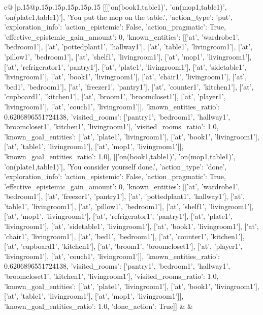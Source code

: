 \documentclass{article}
\begin{document}
{\begin{supertabular}{c@{$\;$}|p{.15\linewidth}@{}p{.15\linewidth}p{.15\linewidth}p{.15\linewidth}p{.15\linewidth}p{.15\linewidth}}
{{{	 [[['on(book1,table1)', 'on(mop1,table1)', 'on(plate1,table1)'], 'You put the mop on the table.', {'action_type': 'put', 'exploration_info': {'action_epistemic': False, 'action_pragmatic': True, 'effective_epistemic_gain_amount': 0, 'known_entities': [['at', 'wardrobe1', 'bedroom1'], ['at', 'pottedplant1', 'hallway1'], ['at', 'table1', 'livingroom1'], ['at', 'pillow1', 'bedroom1'], ['at', 'shelf1', 'livingroom1'], ['at', 'mop1', 'livingroom1'], ['at', 'refrigerator1', 'pantry1'], ['at', 'plate1', 'livingroom1'], ['at', 'sidetable1', 'livingroom1'], ['at', 'book1', 'livingroom1'], ['at', 'chair1', 'livingroom1'], ['at', 'bed1', 'bedroom1'], ['at', 'freezer1', 'pantry1'], ['at', 'counter1', 'kitchen1'], ['at', 'cupboard1', 'kitchen1'], ['at', 'broom1', 'broomcloset1'], ['at', 'player1', 'livingroom1'], ['at', 'couch1', 'livingroom1']], 'known_entities_ratio': 0.6206896551724138, 'visited_rooms': ['pantry1', 'bedroom1', 'hallway1', 'broomcloset1', 'kitchen1', 'livingroom1'], 'visited_rooms_ratio': 1.0, 'known_goal_entities': [['at', 'plate1', 'livingroom1'], ['at', 'book1', 'livingroom1'], ['at', 'table1', 'livingroom1'], ['at', 'mop1', 'livingroom1']], 'known_goal_entities_ratio': 1.0}}], [['on(book1,table1)', 'on(mop1,table1)', 'on(plate1,table1)'], 'You consider yourself done.', {'action_type': 'done', 'exploration_info': {'action_epistemic': False, 'action_pragmatic': True, 'effective_epistemic_gain_amount': 0, 'known_entities': [['at', 'wardrobe1', 'bedroom1'], ['at', 'freezer1', 'pantry1'], ['at', 'pottedplant1', 'hallway1'], ['at', 'table1', 'livingroom1'], ['at', 'pillow1', 'bedroom1'], ['at', 'shelf1', 'livingroom1'], ['at', 'mop1', 'livingroom1'], ['at', 'refrigerator1', 'pantry1'], ['at', 'plate1', 'livingroom1'], ['at', 'sidetable1', 'livingroom1'], ['at', 'book1', 'livingroom1'], ['at', 'chair1', 'livingroom1'], ['at', 'bed1', 'bedroom1'], ['at', 'counter1', 'kitchen1'], ['at', 'cupboard1', 'kitchen1'], ['at', 'broom1', 'broomcloset1'], ['at', 'player1', 'livingroom1'], ['at', 'couch1', 'livingroom1']], 'known_entities_ratio': 0.6206896551724138, 'visited_rooms': ['pantry1', 'bedroom1', 'hallway1', 'broomcloset1', 'kitchen1', 'livingroom1'], 'visited_rooms_ratio': 1.0, 'known_goal_entities': [['at', 'plate1', 'livingroom1'], ['at', 'book1', 'livingroom1'], ['at', 'table1', 'livingroom1'], ['at', 'mop1', 'livingroom1']], 'known_goal_entities_ratio': 1.0}, 'done_action': True}]] 
	  } 
	   } 
	   } 
	 & & \\ 
 

    \theutterance {}  


\end{supertabular}}
\end{document}
